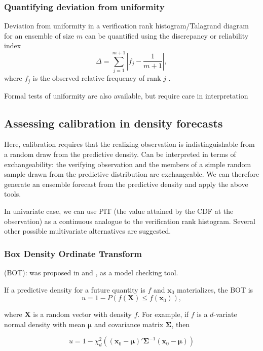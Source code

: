 \documentclass[10pt,fleqn]{article}
\begin{document}
\subsubsection*{Quantifying deviation from uniformity}
Deviation from uniformity in a verification rank histogram/Talagrand diagram for an ensemble of size $m$ can be quantified using the discrepancy or reliability index
%
\[ \Delta = \sum_{j=1}^{m+1} \left\vert f_j - \frac{1}{m+1} \right \vert, \]
%
where $f_j$ is the observed relative frequency of rank $j$ \cite{DelleMonache2006, Berrocal2007}.

Formal tests of uniformity are also available, but require care in interpretation \cite{Hamill2001}

\subsection{Assessing calibration in density forecasts}

Here, calibration requires that the realizing observation is indistinguishable from a random draw from the predictive density. Can be interpreted in terms of exchangeability: the verifying observation and the members of a simple random sample drawn from the predictive distribution are exchangeable. We can therefore generate an ensemble forecast from the predictive density and apply the above tools.

In univariate case, we can use PIT (the value attained by the CDF at the observation) as a continuous analogue to the verification rank histogram. Several other possible multivariate alternatives are suggested.

\subsubsection*{Box Density Ordinate Transform}

(BOT): was proposed in \cite{Box1980} and \cite{OHagan2003}, as a model checking tool.

If a predictive density for a future quantity is $f$ and $\mathbf{x}_0$ materializes, the BOT is
%
\[u = 1-P \left( f(\mathbf{X}) \le f(\mathbf{x}_0) \right), \]

where $\mathbf{X}$ is a random vector with density $f$. For example, if $f$ is a $d$-variate normal density with mean $\boldsymbol{\mu}$ and covariance matrix $\boldsymbol{\Sigma}$, then

\[ u = 1- \chi^2_d \left( (\mathbf{x}_0 -\boldsymbol{\mu})'  \boldsymbol{\Sigma}^{-1} (\mathbf{x}_0 -\boldsymbol{\mu}) \right) \] 
\end{document}
